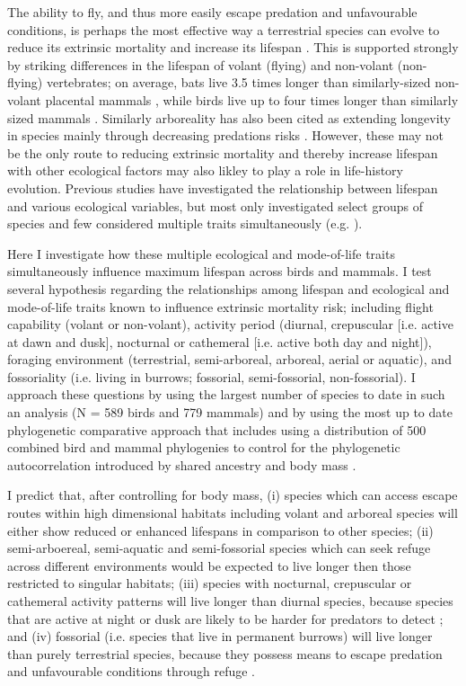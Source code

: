 The ability to fly, and thus more easily escape predation and unfavourable conditions, is perhaps the most effective way a terrestrial species can evolve to reduce its extrinsic mortality and increase its lifespan \citep{partridge1993optimality,holmes1994fly,pomeroy1990fly}. This is supported strongly by striking differences in the lifespan of volant (flying) and non-volant (non-flying) vertebrates; on average, bats live 3.5 times longer than similarly-sized non-volant placental mammals \citep{wilkinson2002life,austad1991mammalian}, while birds live up to four times longer than similarly sized mammals \citep{lindstedt1981body,holmes2003birds}. Similarly arboreality has also been cited as extending longevity in species mainly through decreasing predations risks \citep{shattuck2010arboreality}. However, these may not be the only route to reducing extrinsic mortality and thereby increase lifespan with other ecological factors may also likley to play a role in life-history evolution. Previous studies have investigated the relationship between lifespan and various ecological variables, but most only investigated select groups of species and few considered multiple traits simultaneously (e.g. \cite{shattuck2010arboreality}).

Here I investigate how these multiple ecological and mode-of-life traits simultaneously influence maximum lifespan across birds and mammals. I test several hypothesis regarding the relationships among lifespan and ecological and mode-of-life traits known to influence extrinsic mortality risk; including flight capability (volant or non-volant), activity period (diurnal, crepuscular [i.e. active at dawn and dusk], nocturnal or cathemeral [i.e. active both day and night]), foraging environment (terrestrial, semi-arboreal, arboreal, aerial or aquatic), and fossoriality (i.e. living in burrows; fossorial, semi-fossorial, non-fossorial). I approach these questions by using the largest number of species to date in such an analysis (N =  589 birds and 779 mammals) and by using the most up to date phylogenetic comparative approach that includes using a distribution of 500 combined bird and mammal phylogenies to control for the phylogenetic autocorrelation introduced by shared ancestry \citep{harvey1991comparative} and body mass \citep{lindstedt1981body}.


I predict that, after controlling for body mass, (i) species which can access escape routes within high dimensional habitats including volant and arboreal species will either show reduced or enhanced lifespans in comparison to other species; (ii) semi-arboereal, semi-aquatic and semi-fossorial species which can seek refuge across different environments would be expected to live longer then those restricted to singular habitats; (iii) species with nocturnal, crepuscular or cathemeral activity patterns will live longer than diurnal species, because species that are active at night or dusk are likely to be harder for predators to detect \citep{holmes1994fly,promislow1990living}; and (iv) fossorial (i.e. species that live in permanent burrows) will live longer than purely terrestrial species, because they possess means to escape predation and unfavourable conditions through refuge \citep{buffenstein2002naked}.


